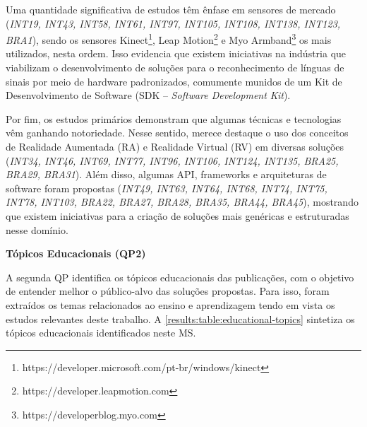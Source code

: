 Uma quantidade significativa de estudos têm ênfase em sensores de mercado (\textit{INT19, INT43, INT58, INT61, INT97, INT105, INT108, INT138, INT123, BRA1}), sendo os sensores Kinect\footnote{https://developer.microsoft.com/pt-br/windows/kinect}, Leap Motion\footnote{https://developer.leapmotion.com} e Myo Armband\footnote{https://developerblog.myo.com} os mais utilizados, nesta ordem. Isso evidencia que existem iniciativas na indústria que viabilizam o desenvolvimento de soluções para o reconhecimento de línguas de sinais por meio de hardware padronizados, comumente munidos de um Kit de Desenvolvimento de Software (SDK -- \textit{Software Development Kit}).

Por fim, os estudos primários demonstram que algumas técnicas e tecnologias vêm ganhando notoriedade. Nesse sentido, merece destaque o uso dos conceitos de Realidade Aumentada (RA) e Realidade Virtual (RV) em diversas soluções (\textit{INT34, INT46, INT69, INT77, INT96, INT106, INT124, INT135, BRA25, BRA29, BRA31}). Além disso, algumas API, frameworks e arquiteturas de software foram propostas (\textit{INT49, INT63, INT64, INT68, INT74, INT75, INT78, INT103, BRA22, BRA27, BRA28, BRA35, BRA44, BRA45}), mostrando que existem iniciativas para a criação de soluções mais genéricas e estruturadas nesse domínio.

\noindent
\textbf{Tópicos Educacionais (QP2)}

A segunda QP identifica os tópicos educacionais das publicações, com o objetivo de entender melhor o público-alvo das soluções propostas. Para isso, foram extraídos os temas relacionados ao ensino e aprendizagem tendo em vista os estudos relevantes deste trabalho. A \autoref{results:table:educational-topics} sintetiza os tópicos educacionais identificados neste MS.

